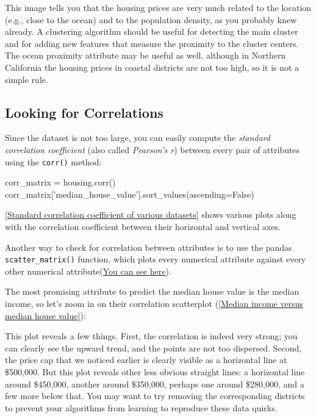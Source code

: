This image tells you that the housing prices are very much related to the location
(e.g., close to the ocean) and to the population density, as you probably knew already.
A clustering algorithm should be useful for detecting the main cluster and for adding
new features that measure the proximity to the cluster centers. The ocean proximity
attribute may be useful as well, although in Northern California the housing prices in
coastal districts are not too high, so it is not a simple rule.

\subsection{Looking for Correlations}
Since the dataset is not too large, you can easily compute the \emph{standard correlation
coefficient} (also called \emph{Pearson’s r}) between every pair of attributes using the \verb|corr()| method:
\begin{pyc}
corr_matrix = housing.corr()
corr_matrix['median_house_value'].sort_values(ascending=False)
\end{pyc}

\autoref{Standard correlation coefficient of various datasets} shows various plots along with the correlation coefficient between their horizontal and vertical axes.


Another way to check for correlation between attributes is to use the pandas
\verb|scatter_matrix()| function, which plots every numerical attribute against every other numerical attribute(\href{https://github.com/JPL-JUNO/HOML/blob/main/chapter/chapter2.ipynb}{You can see here}).

The most promising attribute to predict the median house value is the median
income, so let’s zoom in on their correlation scatterplot (\autoref{Median income versus median house value}):


This plot reveals a few things. First, the correlation is indeed very strong; you can
clearly see the upward trend, and the points are not too dispersed. Second, the price
cap that we noticed earlier is clearly visible as a horizontal line at \$500,000. But this
plot reveals other less obvious straight lines: a horizontal line around \$450,000,
another around \$350,000, perhaps one around \$280,000, and a few more below that.
You may want to try removing the corresponding districts to prevent your algorithms
from learning to reproduce these data quirks.

